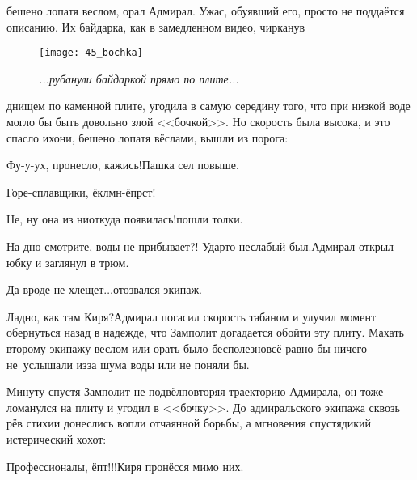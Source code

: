 
\mdash бешено лопатя веслом, орал Адмирал. Ужас, обуявший его, просто не поддаётся описанию. Их байдарка, как в замедленном видео, чирканув 

		\begin{figure}[h]
		\centering
		\texttt{[image: 45\_bochka]}
		\caption{\small\textit{...рубанули байдаркой прямо по плите...}}
		\end{figure}

\noindent днищем по каменной плите, угодила в самую середину того, что при низкой воде могло бы быть довольно злой <<бочкой>>. Но скорость была высока, и это спасло их\mdash они, бешено лопатя вёслами, вышли из порога:%

\diagdash Фу-у-ух, пронесло, кажись!\mdash Пашка сел повыше.

\diagdash Горе-сплавщики, ёклмн-ёпрст!

\diagdash Не, ну она из ниоткуда появилась!\mdash пошли толки.

\diagdash На дно смотрите, воды не прибывает?! Удар\sdash то неслабый был.\mdash Адмирал открыл юбку и заглянул в трюм.%

\diagdash Да вроде не хлещет$\ldots$\mdash отозвался экипаж.

\diagdash Ладно, как там Киря?\mdash Адмирал погасил скорость табаном и улучил момент обернуться назад в надежде, что Замполит догадается обойти эту плиту. Махать второму экипажу веслом или орать было бесполезно\mdash всё равно бы ничего не~услышали из\sdash за шума воды или не поняли бы. 

Минуту спустя Замполит не подвёл\mdash повторяя траекторию Адмирала, он тоже ломанулся на плиту и угодил в <<бочку>>. До адмиральского экипажа сквозь рёв стихии донеслись вопли отчаянной борьбы, а мгновения спустя\mdash дикий истерический хохот:

\diagdash Профессионалы, ёпт!!!\mdash Киря пронёсся мимо них.

